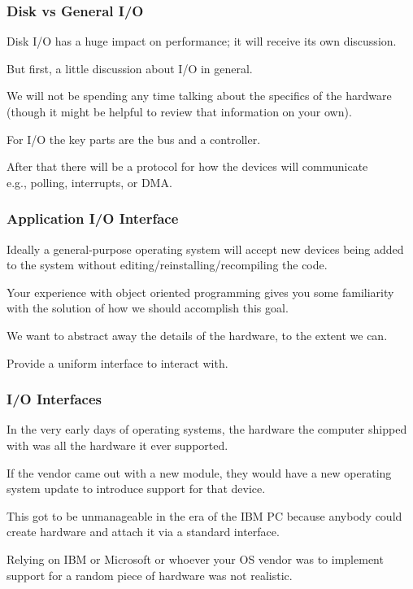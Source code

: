 \begin{frame}
\frametitle{Disk vs General I/O}

Disk I/O has a huge impact on performance; it will receive its own discussion. 

But first, a little discussion about I/O in general.

We will not be spending any time talking about the specifics of the hardware (though it might be helpful to review that information on your own). 

For I/O the key parts are the bus and a controller. 

After that there will be a protocol for how the devices will communicate\\
\quad e.g., polling, interrupts, or DMA.

\end{frame}



\begin{frame}
\frametitle{Application I/O Interface}

Ideally a general-purpose operating system will accept new devices being added to the system without editing/reinstalling/recompiling the code. 

Your experience with object oriented programming gives you some familiarity with the solution of how we should accomplish this goal. 

We want to abstract away the details of the hardware, to the extent we can. 

Provide a uniform \alert{interface} to interact with. 

\end{frame}

\begin{frame}
\frametitle{I/O Interfaces}

In the very early days of operating systems, the hardware the computer shipped with was all the hardware it ever supported. 

If the vendor came out with a new module, they would have a new operating system update to introduce support for that device. 

This got to be unmanageable in the era of the IBM PC because anybody could create hardware and attach it via a standard interface. 

Relying on IBM or Microsoft or whoever your OS vendor was to implement support for a random piece of hardware was not realistic.


\end{frame}

